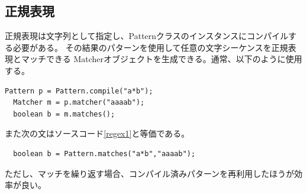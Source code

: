 \documentclass[dvipdfmx]{jsarticle}
\begin{document}
\subsection{正規表現}

正規表現は文字列として指定し、Patternクラスのインスタンスにコンパイルする必要がある。
その結果のパターンを使用して任意の文字シーケンスを正規表現とマッチできる
Matcherオブジェクトを生成できる。通常、以下のように使用する。
\begin{lstlisting}[caption=正規標準の呼び出し方,label=regex1]
  Pattern p = Pattern.compile("a*b");
  Matcher m = p.matcher("aaaab");
  boolean b = m.matches();
\end{lstlisting}
また次の文はソースコード\ref{regex1}と等価である。
\begin{lstlisting}
  boolean b = Pattern.matches("a*b","aaaab");
\end{lstlisting}
ただし、マッチを繰り返す場合、コンパイル済みパターンを再利用したほうが効率が良い。
\end{document}
